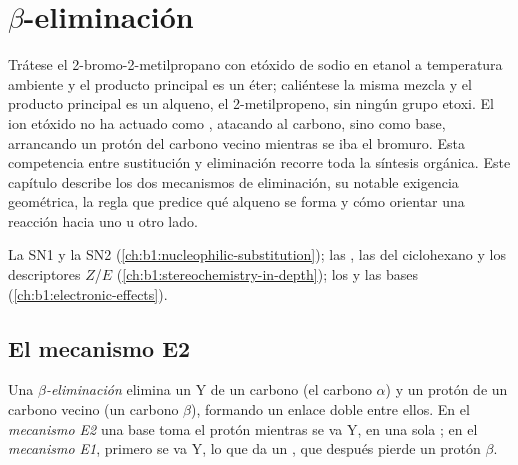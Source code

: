 \chapter{\texorpdfstring{$\beta$}{Beta}-eliminación}\label{ch:b1:elimination}

Trátese el 2-bromo-2-metilpropano con etóxido de sodio en etanol a
temperatura ambiente y el producto principal es un éter; caliéntese la
misma mezcla y el producto principal es un alqueno, el 2-metilpropeno, sin
ningún grupo etoxi. El ion etóxido no ha actuado como , atacando
al carbono, sino como base, arrancando un protón del carbono vecino
mientras se iba el bromuro. Esta competencia entre sustitución y
eliminación recorre toda la síntesis orgánica. Este capítulo describe los
dos mecanismos de eliminación, su notable exigencia geométrica, la regla
que predice qué alqueno se forma y cómo orientar una reacción hacia uno u
otro lado.

\begin{recall}
La SN1 y la SN2 (\cref{ch:b1:nucleophilic-substitution}); las
, las  del ciclohexano y los
descriptores $Z$/$E$ (\cref{ch:b1:stereochemistry-in-depth}); los
 y las bases
(\cref{ch:b1:electronic-effects}).
\end{recall}

\section{El mecanismo E2}

\begin{definition}\label{def:b1:elimination:elimination}
Una \emph{$\beta$-eliminación} elimina un  Y de un carbono (el carbono $\alpha$) y un protón de un carbono
vecino (un carbono $\beta$), formando un enlace doble entre ellos. En el
\emph{mecanismo E2} una base toma el protón mientras
se va Y, en una sola ; en el \emph{mecanismo
E1}, primero se va Y, lo que da un , que
después pierde un protón $\beta$.
\end{definition}

